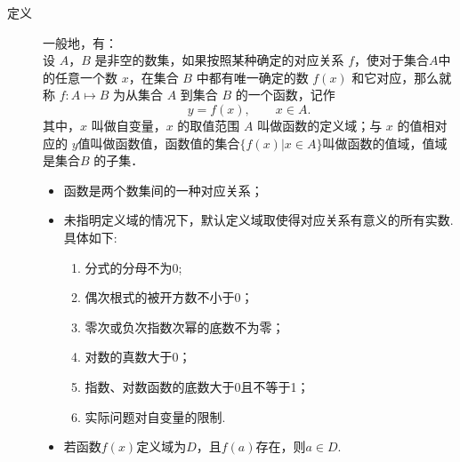   \begin{description}
    \item [定义] 一般地，有：\\
      设 $A$，$B$ 是非空的数集，如果按照某种确定的对应关系 $f$，使对于集合$A$中的任意一个数 $x$，在集合 $B$ 中都有唯一确定的数 $f(x)$ 和它对应，那么就称 $f\colon A\mapsto B$ 为从集合 $A$ 到集合 $B$ 的一个函数，记作
      $$y=f(x),\qquad x\in A.$$
      其中，$x$ 叫做自变量，$x$ 的取值范围 $A$ 叫做函数的定义域；与 $x$ 的值相对应的 $y $值叫做函数值，函数值的集合$\{f(x)|x\in A\}$叫做函数的值域，值域是集合$B$ 的子集．
      \begin{itemize}[leftmargin=*]
        \kaishu
        \item 函数是两个数集间的一种对应关系；
        \item 未指明定义域的情况下，默认定义域取使得对应关系有意义的所有实数. 具体如下:
        \begin{enumerate}[label=\circled{\arabic*}]
          \item 分式的分母不为0;
          \item 偶次根式的被开方数不小于0；
          \item 零次或负次指数次幂的底数不为零；
          \item 对数的真数大于0；
          \item 指数、对数函数的底数大于0且不等于1；
          \item 实际问题对自变量的限制.
        \end{enumerate}
        \item 若函数$f(x)$定义域为$D$，且$f(a)$存在，则$a\in D$.
      \end{itemize}
  \end{description}
  \clearpage

\newpage
